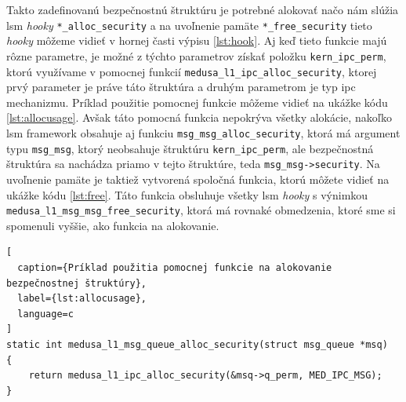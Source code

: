 Takto zadefinovanú bezpečnostnú štruktúru je potrebné alokovať načo nám slúžia \acrshort{lsm} \textit{hooky} \texttt{*\_alloc\_security} a na uvoľnenie pamäte \texttt{*\_free\_security} tieto \textit{hooky} môžeme vidieť v hornej časti výpisu \ref{lst:hook}. Aj keď tieto funkcie majú rôzne parametre, je možné z týchto parametrov získať položku \texttt{kern\_ipc\_perm}, ktorú využívame v pomocnej funkcií \texttt{medusa\_l1\_ipc\_alloc\_security}, ktorej prvý parameter je práve táto štruktúra a druhým parametrom je typ \acrshort{ipc} mechanizmu. Príklad použitie pomocnej funkcie môžeme vidieť na ukážke kódu \ref{lst:allocusage}. Avšak táto pomocná funkcia nepokrýva všetky alokácie, nakoľko \acrshort{lsm} framework obsahuje aj funkciu \texttt{msg\_msg\_alloc\_security}, ktorá má argument typu \texttt{msg\_msg}, ktorý neobsahuje štruktúru \texttt{kern\_ipc\_perm}, ale bezpečnostná štruktúra sa nachádza priamo v tejto štruktúre, teda \texttt{msg\_msg->security}. Na uvoľnenie pamäte je taktiež vytvorená spoločná funkcia, ktorú môžete vidieť na ukážke kódu \ref{lst:free}. Táto funkcia obsluhuje všetky \acrshort{lsm} \textit{hooky} s výnimkou \texttt{medusa\_l1\_msg\_msg\_free\_security}, ktorá má rovnaké obmedzenia, ktoré sme si spomenuli vyššie, ako funkcia na alokovanie.
\begin{lstlisting}[
  caption={Príklad použitia pomocnej funkcie na alokovanie bezpečnostnej štruktúry},
  label={lst:allocusage},
  language=c
]
static int medusa_l1_msg_queue_alloc_security(struct msg_queue *msq)
{
	return medusa_l1_ipc_alloc_security(&msq->q_perm, MED_IPC_MSG);
}
\end{lstlisting} 

